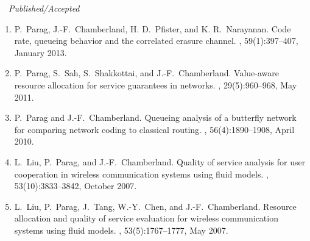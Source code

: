\documentclass[11pt]{article}
\begin{document}
$\quad${\it Published/Accepted}
\begin{enumerate}


\item [{\bf [J5]}] P.~Parag, J.-F.~Chamberland, H. D.~Pfister, and K. R.~Narayanan.
\newblock Code rate, queueing behavior and the correlated erasure channel.
, 59(1):397--407, 
	January 2013. 

\item [{\bf [J4]}] P.~Parag, S.~Sah, S.~Shakkottai, and J.-F.~Chamberland.
\newblock Value-aware resource allocation for service guarantees in networks. 
, 29(5):960--968,
	May 2011.

\item [{\bf [J3]}] P.~Parag and J.-F.~Chamberland.
\newblock Queueing analysis of a butterfly network for comparing network coding to classical routing. 
, 56(4):1890--1908, 
	April 2010. 
	
\item [{\bf [J2]}] L.~Liu, P.~Parag, and J.-F.~Chamberland.
\newblock Quality of service analysis for user cooperation in wireless
  communication systems using fluid models. 
, 53(10):3833--3842, 
  October 2007.
	
\item[{\bf [J1]}] L.~Liu, P.~Parag, J.~Tang, W.-Y.~Chen, and J.-F.~Chamberland.
\newblock Resource allocation and quality of service evaluation for wireless
  communication systems using fluid models. 
, 53(5):1767--1777, 
	May 2007.  

\end{enumerate}
\end{document}
